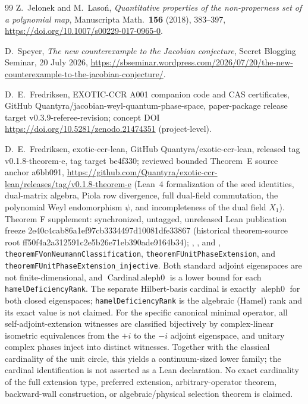 ﻿\documentclass[11pt]{article}
\begin{document}
\begin{thebibliography}{99}
Z.~Jelonek and M.~Laso\'n, \emph{Quantitative properties of the
non-properness set of a polynomial map}, Manuscripta Math.\
\textbf{156} (2018), 383--397,
\url{https://doi.org/10.1007/s00229-017-0965-0}.

D.~Speyer, \emph{The new counterexample to the Jacobian conjecture}, Secret Blogging Seminar, 20 July 2026,
\url{https://sbseminar.wordpress.com/2026/07/20/the-new-counterexample-to-the-jacobian-conjecture/}.

D.~E.~Fredriksen, EXOTIC-CCR A001 companion code and CAS certificates,
GitHub Quantyra/jacobian-weyl-quantum-phase-space, paper-package release
target v0.3.9-referee-revision;
concept DOI \url{https://doi.org/10.5281/zenodo.21474351} (project-level).

D.~E.~Fredriksen, exotic-ccr-lean, GitHub Quantyra/exotic-ccr-lean,
released tag v0.1.8-theorem-e, tag target be4f330; reviewed bounded
Theorem~E source anchor a6bb091,
\url{https://github.com/Quantyra/exotic-ccr-lean/releases/tag/v0.1.8-theorem-e}
(Lean~4 formalization of the seed identities, dual-matrix algebra, Piola row
divergence, full dual-field commutation, the polynomial Weyl endomorphism
\(\psi\), and incompleteness of the dual field \(X_1\)).
Theorem F supplement: synchronized, untagged, unreleased Lean publication
freeze 2e40c4cab86a1ef97cb3334497d10081dfe33867 (historical theorem-source
root ff50f4a2a312591c2e5b26e71eb390ade9164b34);
,
, and
,
\texttt{theoremFVonNeumannClassification},
\texttt{theoremFUnitPhaseExtension}, and
\texttt{theoremFUnitPhaseExtension\_injective}. Both standard
adjoint eigenspaces are not finite-dimensional, and
\(\operatorname{Cardinal.aleph0}\) is a lower bound for each
\texttt{hamelDeficiencyRank}. The separate Hilbert-basis
cardinal is exactly \(\operatorname{aleph0}\) for both closed eigenspaces;
\texttt{hamelDeficiencyRank} is the algebraic (Hamel) rank and its exact
value is not claimed. For the specific canonical minimal operator, all
self-adjoint-extension witnesses are classified bijectively by complex-linear
isometric equivalences from the $+i$ to the $-i$ adjoint eigenspace, and
unitary complex phases inject into distinct witnesses. Together with the
classical cardinality of the unit circle, this yields a continuum-sized lower
family; the cardinal identification is not asserted as a Lean declaration.
No exact cardinality of the full extension type,
preferred extension, arbitrary-operator theorem, backward-wall construction,
or algebraic/physical selection theorem is claimed.
\end{thebibliography}
\end{document}
